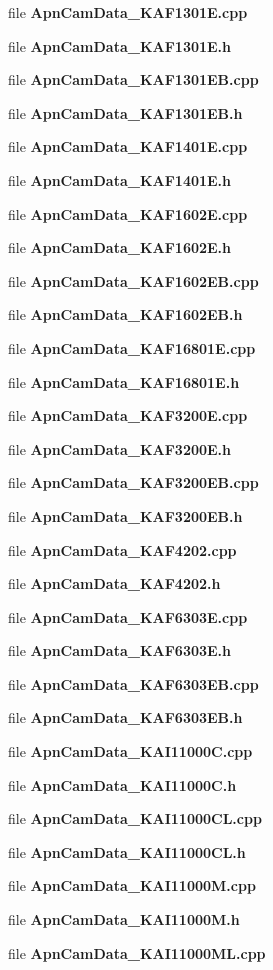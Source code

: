 \begin{CompactItemize}
\item 
file {\bf Apn\-Cam\-Data\_\-KAF1301E.cpp}
\item 
file {\bf Apn\-Cam\-Data\_\-KAF1301E.h}
\item 
file {\bf Apn\-Cam\-Data\_\-KAF1301EB.cpp}
\item 
file {\bf Apn\-Cam\-Data\_\-KAF1301EB.h}
\item 
file {\bf Apn\-Cam\-Data\_\-KAF1401E.cpp}
\item 
file {\bf Apn\-Cam\-Data\_\-KAF1401E.h}
\item 
file {\bf Apn\-Cam\-Data\_\-KAF1602E.cpp}
\item 
file {\bf Apn\-Cam\-Data\_\-KAF1602E.h}
\item 
file {\bf Apn\-Cam\-Data\_\-KAF1602EB.cpp}
\item 
file {\bf Apn\-Cam\-Data\_\-KAF1602EB.h}
\item 
file {\bf Apn\-Cam\-Data\_\-KAF16801E.cpp}
\item 
file {\bf Apn\-Cam\-Data\_\-KAF16801E.h}
\item 
file {\bf Apn\-Cam\-Data\_\-KAF3200E.cpp}
\item 
file {\bf Apn\-Cam\-Data\_\-KAF3200E.h}
\item 
file {\bf Apn\-Cam\-Data\_\-KAF3200EB.cpp}
\item 
file {\bf Apn\-Cam\-Data\_\-KAF3200EB.h}
\item 
file {\bf Apn\-Cam\-Data\_\-KAF4202.cpp}
\item 
file {\bf Apn\-Cam\-Data\_\-KAF4202.h}
\item 
file {\bf Apn\-Cam\-Data\_\-KAF6303E.cpp}
\item 
file {\bf Apn\-Cam\-Data\_\-KAF6303E.h}
\item 
file {\bf Apn\-Cam\-Data\_\-KAF6303EB.cpp}
\item 
file {\bf Apn\-Cam\-Data\_\-KAF6303EB.h}
\item 
file {\bf Apn\-Cam\-Data\_\-KAI11000C.cpp}
\item 
file {\bf Apn\-Cam\-Data\_\-KAI11000C.h}
\item 
file {\bf Apn\-Cam\-Data\_\-KAI11000CL.cpp}
\item 
file {\bf Apn\-Cam\-Data\_\-KAI11000CL.h}
\item 
file {\bf Apn\-Cam\-Data\_\-KAI11000M.cpp}
\item 
file {\bf Apn\-Cam\-Data\_\-KAI11000M.h}
\item 
file {\bf Apn\-Cam\-Data\_\-KAI11000ML.cpp}
\item 

\end{CompactItemize}

